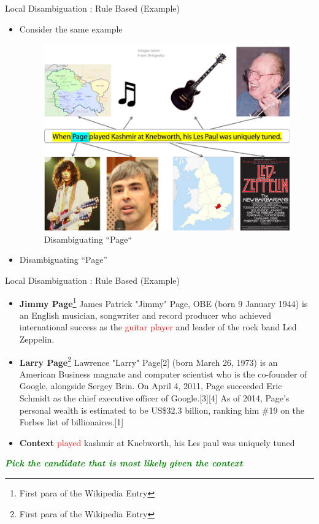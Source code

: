 \documentclass{beamer}
\begin{document}
\begin{frame}{Local Disambiguation : Rule Based (Example)}
\begin{itemize}
\item Consider the same example
 \begin{figure}[h]
 \centering
 \includegraphics[bb=0 0 216 165]{./nedrulebased.png}
 \caption{Disambiguating ``Page``}
\end{figure}
\item Disambiguating ``Page''
\end{itemize}
\end{frame}
\begin{frame}{Local Disambiguation : Rule Based (Example)}
 \begin{itemize}
  \item \textbf{Jimmy Page}\footnote{First para of the Wikipedia Entry} James Patrick "Jimmy" Page, OBE (born 9 January 1944) is an English musician, songwriter and record producer who achieved international success as the \textcolor{red}{guitar player} and leader of the rock band Led Zeppelin.
  \item \textbf{Larry Page}\footnote{First para of the Wikipedia Entry}	 Lawrence "Larry" Page[2] (born March 26, 1973) is an American Business magnate and computer scientist who is the co-founder of Google, alongside Sergey Brin. On April 4, 2011, Page succeeded Eric Schmidt as the chief executive officer of Google.[3][4] As of 2014, Page's personal wealth is estimated to be US\$32.3 billion, ranking him \#19 on the Forbes list of billionaires.[1]
  \item \textbf{Context} \textcolor{red}{played} kashmir at Knebworth, his Les paul was uniquely tuned
  
 \end{itemize}
\textcolor{green}{\textbf{\emph{Pick the candidate that is most likely given the context}}}
\end{frame}
\end{document}
